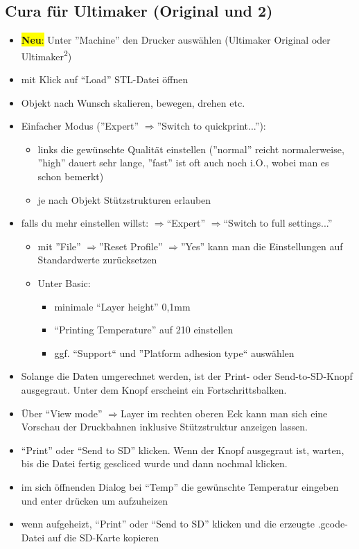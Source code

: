 \documentclass{\basedir/fablab-document}
\newcommand{\ts}[1]{\textsuperscript{#1}}
\newcommand{\ra}{$\Rightarrow$}
\begin{document}
\subsection{Cura für Ultimaker (Original und 2)}
\begin{itemize}
    \item \colorbox{yellow}{\textbf{Neu}:} Unter ''Machine'' den Drucker auswählen (Ultimaker Original oder Ultimaker\ts2)
\item mit Klick auf ``Load'' STL-Datei öffnen
\item Objekt nach Wunsch skalieren, bewegen, drehen etc.
\item Einfacher Modus (''Expert'' \ra ''Switch to quickprint...''):
  \begin{itemize}
    \item links die gewünschte Qualität einstellen (''normal'' reicht normalerweise, ''high'' dauert sehr lange, ''fast'' ist oft auch noch i.O., wobei man es schon bemerkt)
    \item je nach Objekt Stützstrukturen erlauben
  \end{itemize}
\item falls du mehr einstellen willst: \ra ``Expert'' \ra ``Switch to full settings...''
 \begin{itemize}
  \item mit ''File'' \ra ''Reset Profile'' \ra ''Yes'' kann man die Einstellungen auf Standardwerte zurücksetzen
  \item Unter Basic:
  \begin{itemize}
    \item minimale ``Layer height'' 0,1mm
    \item ``Printing Temperature'' auf 210\textcelsius{} einstellen
    \item ggf. ``Support`` und ''Platform adhesion type`` auswählen
   \end{itemize}
 \end{itemize}
\item Solange die Daten umgerechnet werden, ist der Print- oder Send-to-SD-Knopf ausgegraut. Unter dem Knopf erscheint ein Fortschrittsbalken.
\item Über \enquote{View mode} \ra Layer im rechten oberen Eck kann man sich eine Vorschau der Druckbahnen inklusive Stützstruktur anzeigen lassen.
\item ``Print'' oder ``Send to SD'' klicken. Wenn der Knopf ausgegraut ist, warten, bis die Datei fertig gescliced wurde und dann nochmal klicken.
\item im sich öffnenden Dialog bei ``Temp'' die gewünschte Temperatur eingeben und enter drücken um aufzuheizen
\item wenn aufgeheizt, ``Print'' oder ``Send to SD'' klicken und die erzeugte .gcode-Datei auf die SD-Karte kopieren
\end{itemize}
\end{document}
